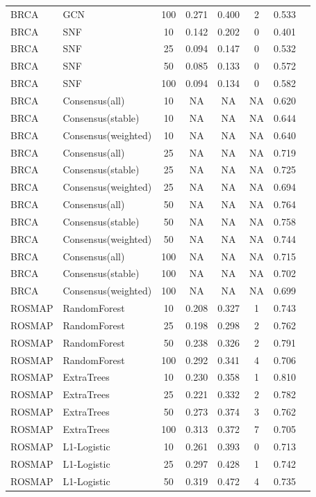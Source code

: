 \documentclass[utf8]{frontiers_suppmat}
\begin{document}
\begin{longtable}{llcccccc}
BRCA & GCN & 100 & 0.271 & 0.400 & 2 & 0.533 \\
BRCA & SNF & 10 & 0.142 & 0.202 & 0 & 0.401 \\
BRCA & SNF & 25 & 0.094 & 0.147 & 0 & 0.532 \\
BRCA & SNF & 50 & 0.085 & 0.133 & 0 & 0.572 \\
BRCA & SNF & 100 & 0.094 & 0.134 & 0 & 0.582 \\
BRCA & Consensus(all) & 10 & NA & NA & NA & 0.620 \\
BRCA & Consensus(stable) & 10 & NA & NA & NA & 0.644 \\
BRCA & Consensus(weighted) & 10 & NA & NA & NA & 0.640 \\
BRCA & Consensus(all) & 25 & NA & NA & NA & 0.719 \\
BRCA & Consensus(stable) & 25 & NA & NA & NA & 0.725 \\
BRCA & Consensus(weighted) & 25 & NA & NA & NA & 0.694 \\
BRCA & Consensus(all) & 50 & NA & NA & NA & 0.764 \\
BRCA & Consensus(stable) & 50 & NA & NA & NA & 0.758 \\
BRCA & Consensus(weighted) & 50 & NA & NA & NA & 0.744 \\
BRCA & Consensus(all) & 100 & NA & NA & NA & 0.715 \\
BRCA & Consensus(stable) & 100 & NA & NA & NA & 0.702 \\
BRCA & Consensus(weighted) & 100 & NA & NA & NA & 0.699 \\
ROSMAP & RandomForest & 10 & 0.208 & 0.327 & 1 & 0.743 \\
ROSMAP & RandomForest & 25 & 0.198 & 0.298 & 2 & 0.762 \\
ROSMAP & RandomForest & 50 & 0.238 & 0.326 & 2 & 0.791 \\
ROSMAP & RandomForest & 100 & 0.292 & 0.341 & 4 & 0.706 \\
ROSMAP & ExtraTrees & 10 & 0.230 & 0.358 & 1 & 0.810 \\
ROSMAP & ExtraTrees & 25 & 0.221 & 0.332 & 2 & 0.782 \\
ROSMAP & ExtraTrees & 50 & 0.273 & 0.374 & 3 & 0.762 \\
ROSMAP & ExtraTrees & 100 & 0.313 & 0.372 & 7 & 0.705 \\
ROSMAP & L1-Logistic & 10 & 0.261 & 0.393 & 0 & 0.713 \\
ROSMAP & L1-Logistic & 25 & 0.297 & 0.428 & 1 & 0.742 \\
ROSMAP & L1-Logistic & 50 & 0.319 & 0.472 & 4 & 0.735 \\

\end{longtable}
\end{document}
